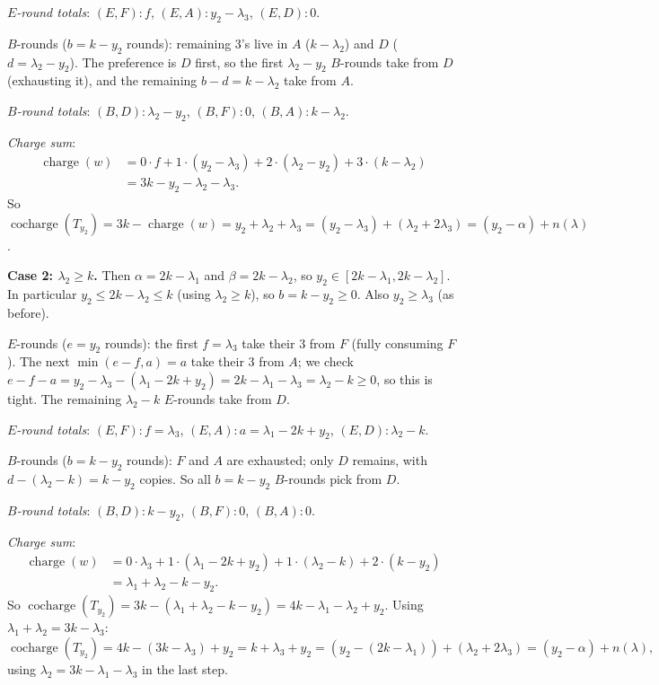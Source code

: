 \documentclass[11pt]{article}
\theoremstyle{definition}
\theoremstyle{remark}
\DeclareMathOperator{\cocharge}{cocharge}
\DeclareMathOperator{\charge}{charge}
\begin{document}
\emph{$E$-round totals}: $(E,F): f$, $(E,A): y_2 - \lambda_3$, $(E,D): 0$.

$B$-rounds ($b = k - y_2$ rounds): remaining $3$'s live in $A$ ($k -
\lambda_2$) and $D$ ($d = \lambda_2 - y_2$). The preference is $D$ first,
so the first $\lambda_2 - y_2$ $B$-rounds take from $D$ (exhausting it),
and the remaining $b - d = k - \lambda_2$ take from $A$.

\emph{$B$-round totals}: $(B,D): \lambda_2 - y_2$, $(B,F): 0$,
$(B,A): k - \lambda_2$.

\emph{Charge sum}:
\begin{align*}
\charge(w) &= 0\cdot f + 1\cdot(y_2 - \lambda_3) + 2\cdot(\lambda_2 - y_2)
              + 3\cdot(k - \lambda_2) \\
           &= 3k - y_2 - \lambda_2 - \lambda_3.
\end{align*}
So
$\cocharge(T_{y_2}) = 3k - \charge(w) = y_2 + \lambda_2 + \lambda_3
= (y_2 - \lambda_3) + (\lambda_2 + 2\lambda_3) = (y_2 - \alpha) + n(\lambda)$.

\smallskip

\noindent\textbf{Case 2: $\lambda_2 \ge k$.} Then $\alpha = 2k - \lambda_1$
and $\beta = 2k - \lambda_2$, so $y_2 \in [2k - \lambda_1, 2k - \lambda_2]$.
In particular $y_2 \le 2k - \lambda_2 \le k$ (using $\lambda_2 \ge k$),
so $b = k - y_2 \ge 0$. Also $y_2 \ge \lambda_3$ (as before).

$E$-rounds ($e = y_2$ rounds): the first $f = \lambda_3$ take their $3$
from $F$ (fully consuming $F$). The next $\min(e - f, a) = a$ take their
$3$ from $A$; we check $e - f - a = y_2 - \lambda_3 - (\lambda_1 - 2k
+ y_2) = 2k - \lambda_1 - \lambda_3 = \lambda_2 - k \ge 0$, so this is
tight. The remaining $\lambda_2 - k$ $E$-rounds take from $D$.

\emph{$E$-round totals}: $(E,F): f = \lambda_3$, $(E,A): a = \lambda_1 - 2k
+ y_2$, $(E,D): \lambda_2 - k$.

$B$-rounds ($b = k - y_2$ rounds): $F$ and $A$ are exhausted; only $D$
remains, with $d - (\lambda_2 - k) = k - y_2$ copies. So all $b = k - y_2$
$B$-rounds pick from $D$.

\emph{$B$-round totals}: $(B,D): k - y_2$, $(B,F): 0$, $(B,A): 0$.

\emph{Charge sum}:
\begin{align*}
\charge(w) &= 0\cdot\lambda_3 + 1\cdot(\lambda_1 - 2k + y_2)
              + 1\cdot(\lambda_2 - k) + 2\cdot(k - y_2) \\
           &= \lambda_1 + \lambda_2 - k - y_2.
\end{align*}
So $\cocharge(T_{y_2}) = 3k - (\lambda_1 + \lambda_2 - k - y_2) = 4k -
\lambda_1 - \lambda_2 + y_2$. Using $\lambda_1 + \lambda_2 = 3k - \lambda_3$:
\[
    \cocharge(T_{y_2}) = 4k - (3k - \lambda_3) + y_2 = k + \lambda_3 + y_2
    = (y_2 - (2k - \lambda_1)) + (\lambda_2 + 2\lambda_3)
    = (y_2 - \alpha) + n(\lambda),
\]
using $\lambda_2 = 3k - \lambda_1 - \lambda_3$ in the last step.
\end{document}
